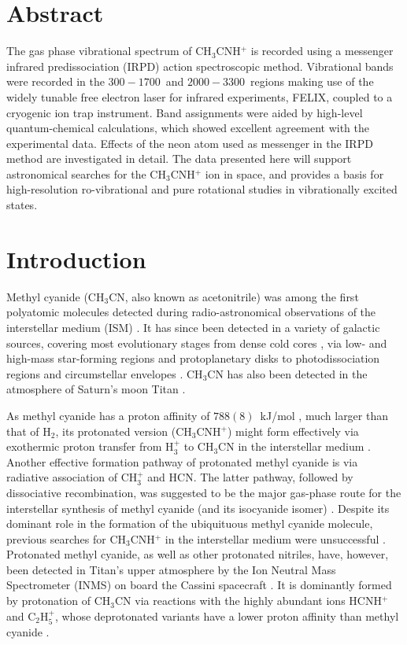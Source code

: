 \newcommand{\pa}{CH$_3$CNH$^+$ }
\newcommand{\pan}{CH$_3$CNH$^+$}

\section*{Abstract}
The gas phase vibrational spectrum of \pa is recorded using a messenger infrared predissociation (IRPD) action spectroscopic method. Vibrational bands were recorded in the $300-1700$~\wnn and $2000-3300$~\wnn regions making use of the widely tunable free electron laser for infrared experiments, FELIX, coupled to a cryogenic ion trap instrument. Band assignments were aided by high-level quantum-chemical calculations, which showed excellent agreement with the experimental data. Effects of the neon atom used as messenger in the IRPD method are investigated in detail. The data presented here will support astronomical searches for the \pa ion in space, and provides a basis for high-resolution ro-vibrational and pure rotational studies in vibrationally excited states.
\clearpage

\section{Introduction}

Methyl cyanide (CH$_3$CN, also known as acetonitrile) was among the first polyatomic molecules detected during radio-astronomical observations of the interstellar medium (ISM) \cite{SJP1971}. It has since been detected in a variety of galactic sources, covering most evolutionary stages from dense cold cores \cite{GMO2016,VLW2019}, via low- and high-mass star-forming regions \cite{AGM2018,FOG2015} and protoplanetary disks \cite{OGF2015} to photodissociation regions \cite{GPG2014} and circumstellar envelopes \cite{ACQ2015}. CH$_3$CN has also been detected in the atmosphere of Saturn's moon Titan \cite{MHB2002,Thelen2019AbundanceObservations,IST2020}.

As methyl cyanide has a proton affinity of $788(8)$~kJ/mol \cite{KFM1986}, much larger than that of H$_2$, its protonated version (\pan) might form effectively via exothermic proton transfer from H$_3^+$ to CH$_3$CN in the interstellar medium \cite{ILB1981}. Another effective formation pathway of protonated methyl cyanide is via radiative association of CH$_3^+$ and HCN. The latter pathway, followed by dissociative recombination, was suggested to be the major gas-phase route for the interstellar synthesis of methyl cyanide (and its isocyanide isomer) \cite{HM1979,DMH1985, VKH2008}. Despite its dominant role in the formation of the ubiquituous methyl cyanide molecule, previous searches for \pa in the interstellar medium were unsuccessful \cite{TAF1990}. Protonated methyl cyanide, as well as other protonated nitriles, have, however, been detected in Titan's upper atmosphere by the Ion Neutral Mass Spectrometer (INMS) on board the Cassini spacecraft \cite{VYA2006}. It is dominantly formed by protonation of CH$_3$CN via reactions with the highly abundant ions HCNH$^+$ and C$_2$H$_5^+$, whose deprotonated variants have a lower proton affinity than methyl cyanide \cite{VYM2007}.

